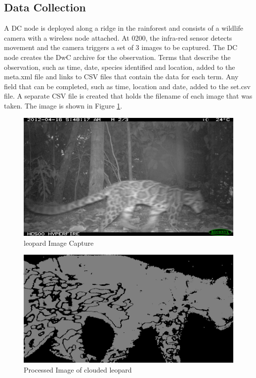 		\subsection{Data Collection}
			A DC node is deployed along a ridge in the rainforest and consists of a wildlife camera with a wireless node attached. At 0200, the infra-red sensor detects movement and the camera triggers a set of 3 images to be captured. The DC node creates the DwC archive for the observation. Terms that describe the observation, such as time, date, species identified and location, \DIFdelbegin {}\DIFdelend \DIFaddbegin {}\DIFaddend added to the meta.xml file and links to CSV files that contain the data for each term. Any field that can be completed, such as time, location and date, \DIFdelbegin {}\DIFdelend \DIFaddbegin {}\DIFaddend added to the set.csv file. A separate CSV file is created that holds the filename of each image that was taken. The image is shown in Figure \ref{cl2}.

			\begin{figure}[!t]
			\centering
			\includegraphics[width=\textwidth]{Chap4/figures/leopard2.JPG}
			\caption{\DIFdelbeginFL {}\DIFdelendFL \DIFaddbeginFL {}\DIFaddendFL leopard Image Capture}
			\label{cl2}
			\end{figure}

			\begin{figure}[!t]
			\centering
			\includegraphics[width=\textwidth]{Chap4/figures/leopard_proc}
			\caption{Processed Image of clouded leopard}
			\label{clproc}
			\end{figure}

